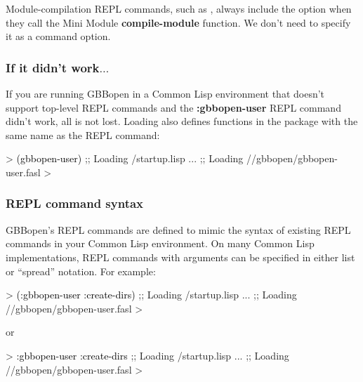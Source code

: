 \documentclass[10pt,twoside,english,pdftex]{article}
\begin{document}
Module-compilation REPL commands, such as ,
always include the  option when they call the Mini Module
\textbf{compile-module} function.  We don't need to specify it as a command
option.

\subsubsection*{If it didn't work$\ldots$}

If you are running GBBopen in a Common Lisp environment that doesn't support
top-level REPL commands and the \textbf{:gbbopen-user} REPL command didn't
work, all is not lost.  Loading  also defines
functions in the  package with the same name as the
REPL command:
%
\begin{example}\color{darkergray}%
  > \textcolor{black}{(gbbopen-user)}
  ;; Loading /startup.lisp
     ...
  ;; Loading //gbbopen/gbbopen-user.fasl
  >
\end{example}

\subsubsection*{REPL command syntax}

GBBopen's REPL commands are defined to mimic the syntax of existing REPL
commands in your Common Lisp environment.  On many Common Lisp
implementations, REPL commands with arguments can be specified in either list
or ``spread'' notation.  For example:
%
\begin{example}\color{darkergray}%
  > \textcolor{black}{(:gbbopen-user :create-dirs)}
  ;; Loading /startup.lisp
     ...
  ;; Loading //gbbopen/gbbopen-user.fasl
  >
\end{example}
%
or
%
\begin{example}\color{darkergray}%
  > \textcolor{black}{:gbbopen-user :create-dirs}
  ;; Loading /startup.lisp
     ...
  ;; Loading //gbbopen/gbbopen-user.fasl
  >
\end{example}
\end{document}
